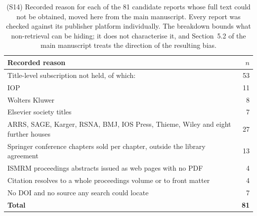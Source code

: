 \documentclass[11pt]{article}
\begin{document}
\begin{table}[t]
\centering
\caption{(S14) Recorded reason for each of the 81 candidate reports whose full text could
not be obtained, moved here from the main manuscript. Every report was checked against its
publisher platform individually. The breakdown bounds what non-retrieval can be hiding; it
does not characterise it, and Section~5.2 of the main manuscript treats the direction of
the resulting bias.}
\label{tab:nonretrieval}
\small
\begin{tabular}{>{\raggedright\arraybackslash}p{} r}
\hline
\textbf{Recorded reason} & \textbf{$n$} \\
\hline
Title-level subscription not held, of which: & 53 \\
\quad IOP & 11 \\
\quad Wolters Kluwer & 8 \\
\quad Elsevier society titles & 7 \\
\quad ARRS, SAGE, Karger, RSNA, BMJ, IOS Press, Thieme, Wiley and eight further houses & 27 \\
Springer conference chapters sold per chapter, outside the library agreement & 13 \\
ISMRM proceedings abstracts issued as web pages with no PDF & 4 \\
Citation resolves to a whole proceedings volume or to front matter & 4 \\
No DOI and no source any search could locate & 7 \\
\hline
\textbf{Total} & \textbf{81} \\
\hline
\end{tabular}
\end{table}

\clearpage

\renewcommand{\refname}{References (included studies and supplementary citations)}




\end{document}
